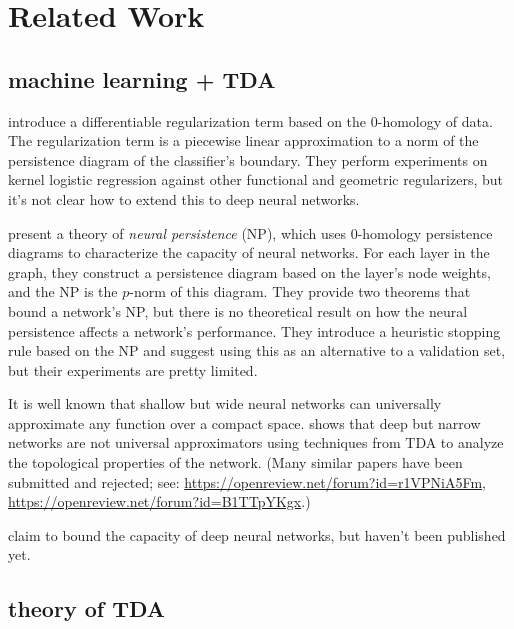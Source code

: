 \documentclass{article}
\newcommand{\defn}[1]{\textit{#1}}
\begin{document}

\section{Related Work}

\subsection{machine learning + TDA}

\citet{chen2019topological} introduce a differentiable regularization term based on the 0-homology of data.
The regularization term is a piecewise linear approximation to a norm of the persistence diagram of the classifier's boundary.
They perform experiments on kernel logistic regression against other functional and geometric regularizers,
but it's not clear how to extend this to deep neural networks.

\citet{rieck2019neural} present a theory of \defn{neural persistence} (NP),
which uses 0-homology persistence diagrams to characterize the capacity of neural networks.
For each layer in the graph,
they construct a persistence diagram based on the layer's node weights,
and the NP is the $p$-norm of this diagram.
They provide two theorems that bound a network's NP,
but there is no theoretical result on how the neural persistence affects a network's performance.
They introduce a heuristic stopping rule based on the NP and suggest using this as an alternative to a validation set,
but their experiments are pretty limited.

It is well known that shallow but wide neural networks can universally approximate any function over a compact space.
\citet{johnson2019deep} shows that deep but narrow networks are not universal approximators using techniques from TDA to analyze the topological properties of the network.
(Many similar papers have been submitted and rejected; see: 
\url{https://openreview.net/forum?id=r1VPNiA5Fm}, 
\url{https://openreview.net/forum?id=B1TTpYKgx}.)

\citet{guss2018characterizing,ramamurthy2018topological} claim to bound the capacity of deep neural networks,
but haven't been published yet.

\subsection{theory of TDA}
\end{document}
